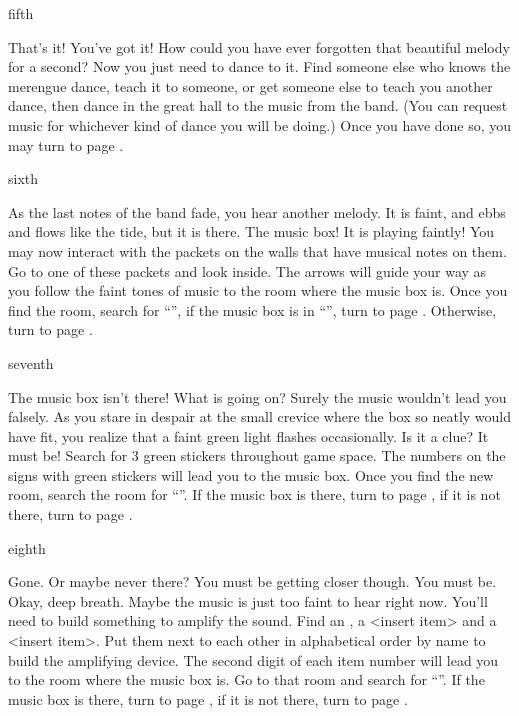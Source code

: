 \documentclass[greennotebook]{NeptuneBall}
\begin{document}
\begin{page}{fifth}

That's it! You've got it! How could you have ever forgotten that beautiful melody for a second? Now you just need to dance to it. Find someone else who knows the merengue dance, teach it to someone, or get someone else to teach you another dance, then dance in the great hall to the music from the band. (You can request music for whichever kind of dance you will be doing.) Once you have done so, you may turn to page .

\end{page}

\begin{page}{sixth}

As the last notes of the band fade, you hear another melody. It is faint, and ebbs and flows like the tide, but it is there. The music box! It is playing faintly! You may now interact with the packets on the walls that have musical notes on them. Go to one of these packets and look inside. The arrows will guide your way as you follow the faint tones of music to the room where the music box is. Once you find the room, search for ``\sPacketA{}'', if the music box is in ``\sPacketA{}'', turn to page . Otherwise, turn to page .

\end{page}

\begin{page}{seventh}

The music box isn't there! What is going on? Surely the music wouldn't lead you falsely. As you stare in despair at the small crevice where the box so neatly would have fit, you realize that a faint green light flashes occasionally. Is it a clue? It must be!  Search for 3 green stickers throughout game space. The numbers on the signs with green stickers will lead you to the music box. Once you find the new room, search the room for ``\sPacketB{}''. If the music box is there, turn to page , if it is not there, turn to page .

\end{page}

\begin{page}{eighth}

Gone. Or maybe never there? You must be getting closer though. You must be. Okay, deep breath. Maybe the music is just too faint to hear right now. You'll need to build something to amplify the sound. Find an \iConch{}, a <insert item> and a <insert item>. Put them next to each other in alphabetical order by name to build the amplifying device. The second digit of each item number will lead you to the room where the music box is. Go to that room and search for ``\sPacketC{}''. If the music box is there, turn to page , if it is not there, turn to page .

\end{page}
\end{document}
